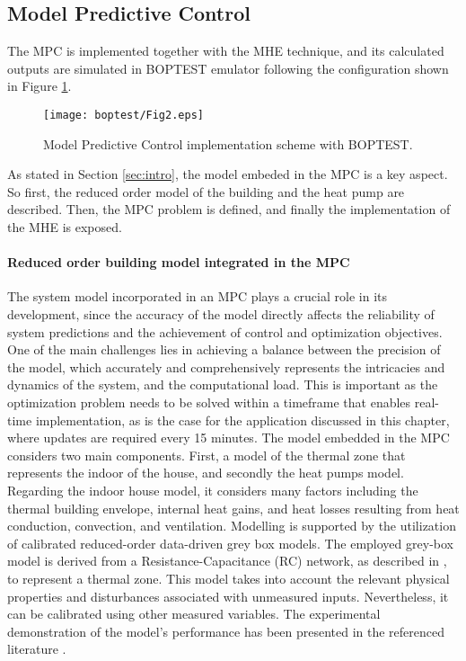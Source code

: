 \subsection{Model Predictive Control}
\label{sec:MPC}
The MPC is implemented together with the MHE technique, and its calculated outputs are simulated in BOPTEST emulator following the configuration shown in Figure \ref{fig:2}.

\begin{figure}
  \texttt{[image: boptest/Fig2.eps]}
\caption{Model Predictive Control implementation scheme with BOPTEST.}
\label{fig:2}       %
\end{figure}
%

As stated in Section \ref{sec:intro}, the model embeded in the MPC is a key aspect. So first, the reduced order model of the building and the heat pump are described. Then, the MPC problem is defined, and finally the implementation of the MHE is exposed.

\paragraph{Reduced order building model integrated in the MPC} 

The system model incorporated in an MPC plays a crucial role in its development, since the accuracy of the model directly affects the reliability of system predictions and the achievement of control and optimization objectives. One of the main challenges lies in achieving a balance between the precision of the model, which accurately and comprehensively represents the intricacies and dynamics of the system, and the computational load. This is important as the optimization problem needs to be solved within a timeframe that enables real-time implementation, as is the case for the application discussed in this chapter, where updates are required every 15 minutes.
The model embedded in the MPC considers two main components. First, a model of the thermal zone that represents the indoor of the house, and secondly the heat pumps model.
Regarding the indoor house model, it considers many factors including the thermal building envelope, internal heat gains, and heat losses resulting from heat conduction, convection, and ventilation. Modelling is supported by the utilization of calibrated reduced-order data-driven grey box models. The employed grey-box model is derived from a Resistance-Capacitance (RC) network, as described in \cite{Kim2018_2}, to represent a thermal zone. This model takes into account the relevant physical properties and disturbances associated with unmeasured inputs. Nevertheless, it can be calibrated using other measured variables. The experimental demonstration of the model's performance has been presented in the referenced literature \cite{Kim2016}.

